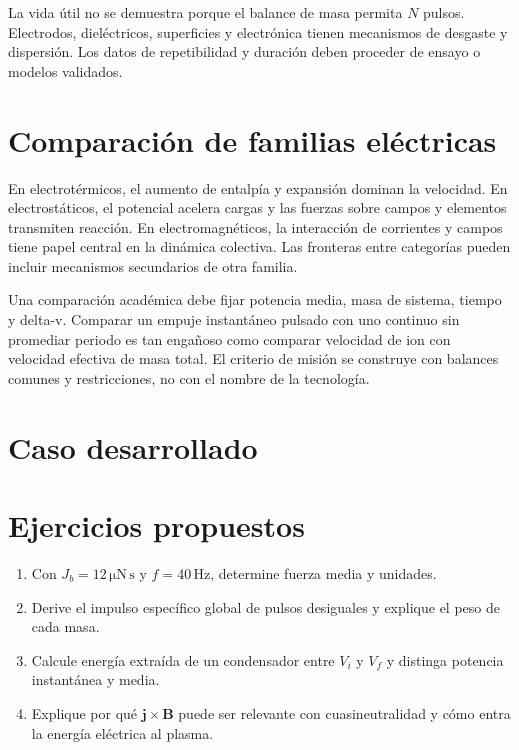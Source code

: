 La vida útil no se demuestra porque el balance de masa permita $N$ pulsos. Electrodos, dieléctricos, superficies y electrónica tienen mecanismos de desgaste y dispersión. Los datos de repetibilidad y duración deben proceder de ensayo o modelos validados.
\section{Comparación de familias eléctricas}
En electrotérmicos, el aumento de entalpía y expansión dominan la velocidad. En electrostáticos, el potencial acelera cargas y las fuerzas sobre campos y elementos transmiten reacción. En electromagnéticos, la interacción de corrientes y campos tiene papel central en la dinámica colectiva. Las fronteras entre categorías pueden incluir mecanismos secundarios de otra familia.

Una comparación académica debe fijar potencia media, masa de sistema, tiempo y delta-v. Comparar un empuje instantáneo pulsado con uno continuo sin promediar periodo es tan engañoso como comparar velocidad de ion con velocidad efectiva de masa total. El criterio de misión se construye con balances comunes y restricciones, no con el nombre de la tecnología.
\section{Caso desarrollado}

\section{Ejercicios propuestos}
\begin{enumerate}
\item Con $J_b=12\,\mathrm{\mu N\,s}$ y $f=40\,\mathrm{Hz}$, determine fuerza media y unidades.
\item Derive el impulso específico global de pulsos desiguales y explique el peso de cada masa.
\item Calcule energía extraída de un condensador entre $V_i$ y $V_f$ y distinga potencia instantánea y media.
\item Explique por qué $\mathbf j\times\mathbf B$ puede ser relevante con cuasineutralidad y cómo entra la energía eléctrica al plasma.
\end{enumerate}


\studiumchaptercheck
